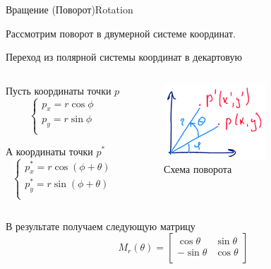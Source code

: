 \documentclass{beamer}
\begin{document}
	\begin{frame}{Вращение (Поворот)}{Rotation}
		
		Рассмотрим поворот в двумерной системе координат.

		\begin{center}
			Переход из полярной системы координат в декартовую
		\end{center} 



		\begin{columns}
			\begin{column}{0.5\textwidth}
				Пусть координаты точки $p$
				\[
					\begin{cases}
						p_x = r \cos \phi \\
						p_y = r \sin \phi \\
					\end{cases}
				\]

				А координаты точки $p^*$
				\[
					\begin{cases}
						p_x^* = r \cos (\phi + \theta) \\
						p_y^* = r \sin (\phi + \theta) \\
					\end{cases}
				\]
			\end{column}
			\begin{column}{0.5\textwidth}

				\begin{figure} 
						\includegraphics[width=0.6\textwidth]{images/rotation.png}
					\caption{Схема поворота}
				\end{figure}

			\end{column}
		\end{columns}



		В результате получаем следующую матрицу
		\[
			M_r(\theta) =
			\begin{bmatrix}
				\cos \theta & \sin \theta \\
				-\sin \theta & \cos \theta  \\
			\end{bmatrix}
		\]


\end{frame}
\end{document}
